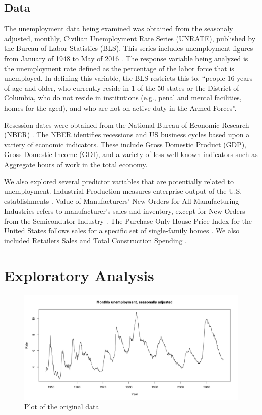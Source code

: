 \documentclass[twoside,twocolumn]{article}
\begin{document}
\subsection{Data}

The unemployment data being examined was obtained from the seasonaly adjusted, monthly, Civilian Unemployment Rate Series (UNRATE), published by the Bureau of Labor Statistics (BLS).  This series includes unemployment figures from January of 1948 to  May of 2016 \citep{blsrefsa}.  The response variable being analyzed is the unemployment rate defined as the percentage of the labor force that is unemployed.  In defining this variable, the BLS restricts this to, ``people 16 years of age and older, who currently reside in 1 of the 50 states or the District of Columbia, who do not reside in institutions (e.g., penal and mental facilities, homes for the aged), and who are not on active duty in the Armed Forces''.

Resession dates were obtained from the National Bureau of Economic Research (NBER) \citep{NBER2016}. The NBER identifies recessions and US business cycles based upon a variety of economic indicators. These include Gross Domestic Product (GDP), Gross Domestic Income (GDI), and a variety of less well known indicators such as Aggregate hours of work in the total economy.

We also explored several predictor variables that are potentially related to unemployment.  Industrial Production measures enterprise output of the U.S. establishments \citep{BGFS2016}. Value of Manufacturers' New Orders for All Manufacturing Industries refers to manufacturer's sales and inventory, except for New Orders from the Semicondutor Industry \citep{vmno}. The Purchase Only House Price Index for the United States follows sales for a specific set of single-family homes \citep{fhfa2016}. We also included Retailers Sales \citep{retail2016} and Total Construction Spending \citep{construction2016}.


\section{Exploratory Analysis}
		\begin{figure}[H]
		\centering
		\caption{Plot of the original data}
		\label{fig:unemployment}
		\includegraphics[width=\linewidth]{images/unemployment_total_sa}
	\end{figure}
	
\end{document}
